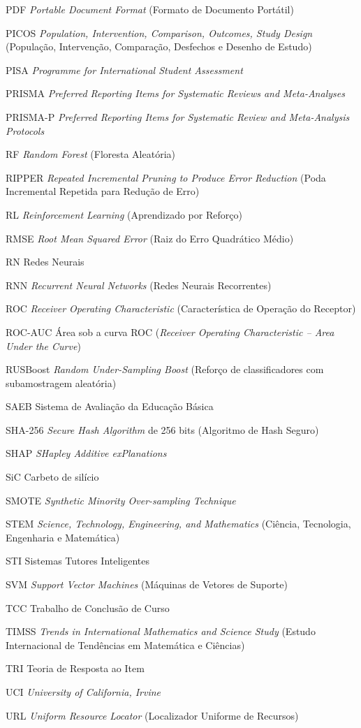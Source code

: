 \documentclass[
	12pt,
	oneside,
	a4paper,
	chapter=TITLE,
	section=TITLE,
	subsection=TITLE,
	english,
	brazil,
	sumario=tradicional,
]{abntex2-IFC}
\begin{document}
\begin{siglas}
  \item[PDF] \textit{Portable Document Format} (Formato de Documento Portátil)
  \item[PICOS] \textit{Population, Intervention, Comparison, Outcomes, Study Design} (População, Intervenção, Comparação, Desfechos e Desenho de Estudo)
  \item[PISA] \textit{Programme for International Student Assessment}
  \item[PRISMA] \textit{Preferred Reporting Items for Systematic Reviews and Meta-Analyses}
  \item[PRISMA-P] \textit{Preferred Reporting Items for Systematic Review and Meta-Analysis Protocols}
  \item[RF] \textit{Random Forest} (Floresta Aleatória)
  \item[RIPPER] \textit{Repeated Incremental Pruning to Produce Error Reduction} (Poda Incremental Repetida para Redução de Erro)
  \item[RL] \textit{Reinforcement Learning} (Aprendizado por Reforço)
  \item[RMSE] \textit{Root Mean Squared Error} (Raiz do Erro Quadrático Médio)
  \item[RN] Redes Neurais
  \item[RNN] \textit{Recurrent Neural Networks} (Redes Neurais Recorrentes)
  \item[ROC] \textit{Receiver Operating Characteristic} (Característica de Operação do Receptor)
  \item[ROC-AUC] Área sob a curva ROC (\textit{Receiver Operating Characteristic -- Area Under the Curve})
  \item[RUSBoost] \textit{Random Under-Sampling Boost} (Reforço de classificadores com subamostragem aleatória)
  \item[SAEB] Sistema de Avaliação da Educação Básica
  \item[SHA-256] \textit{Secure Hash Algorithm} de 256 bits (Algoritmo de Hash Seguro)
  \item[SHAP] \textit{SHapley Additive exPlanations}
  \item[SiC] Carbeto de silício
  \item[SMOTE] \textit{Synthetic Minority Over-sampling Technique}
  \item[STEM] \textit{Science, Technology, Engineering, and Mathematics} (Ciência, Tecnologia, Engenharia e Matemática)
  \item[STI] Sistemas Tutores Inteligentes
  \item[SVM] \textit{Support Vector Machines} (Máquinas de Vetores de Suporte)
  \item[TCC] Trabalho de Conclusão de Curso
  \item[TIMSS] \textit{Trends in International Mathematics and Science Study} (Estudo Internacional de Tendências em Matemática e Ciências)
  \item[TRI] Teoria de Resposta ao Item
  \item[UCI] \textit{University of California, Irvine}
  \item[URL] \textit{Uniform Resource Locator} (Localizador Uniforme de Recursos)
\end{siglas}
\end{document}
